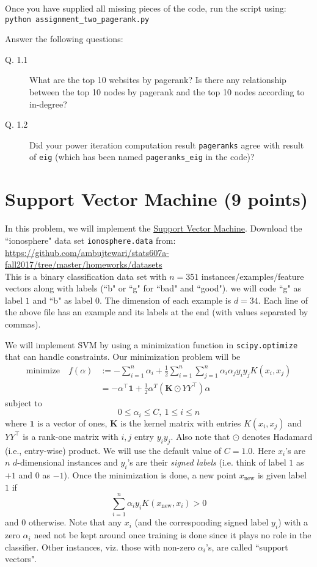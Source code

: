 \documentclass{article}
\begin{document}
Once you have supplied all missing pieces of the code, run the script using:\\
{\tt python assignment\_two\_pagerank.py}

Answer the following questions:
\begin{description}
\item[Q. 1.1]
What are the top 10 websites by pagerank? Is there any relationship between the top 10 nodes by pagerank and the top 10 nodes according to in-degree?
\item[Q. 1.2]
Did your power iteration computation result {\tt pageranks} agree with result of {\tt eig} (which has been named {\tt pageranks\_eig} in the code)?
\end{description}


\section{Support Vector Machine (9 points)}


In this problem, we will implement the \href{http://en.wikipedia.org/wiki/Support\_vector\_machine}{Support Vector Machine}.
Download the ``ionosphere" data set {\tt ionosphere.data} from:\\
\url{https://github.com/ambujtewari/stats607a-fall2017/tree/master/homeworks/datasets} \\
This is a binary classification data set with $n=351$ instances/examples/feature vectors along with labels (``b" or ``g" for ``bad" and ``good"). we will code ``g"
as label $1$ and ``b" as label $0$.
The dimension of each example is $d=34$. Each line of the above file has an example and its labels at the end (with values separated by commas).

We will implement SVM by using a minimization function in {\tt scipy.optimize} that can handle constraints. Our minimization problem will be
\begin{align*}
\text{minimize}\quad f(\alpha) &:= -\sum_{i=1}^n \alpha_i + \frac{1}{2} \sum_{i=1}^n \sum_{j=1}^n \alpha_i \alpha_j y_i y_j K(x_i, x_j) \\
&= -\alpha^\top \mathbf{1} + \frac{1}{2} \alpha^T (\mathbf{K} \odot YY^\top) \alpha
\end{align*}
subject to
$$
0 \leq \alpha_i \leq C,\ 1 \leq i \leq n
$$
where $\mathbf{1}$ is a vector of ones, $\mathbf{K}$ is the kernel matrix with entries $K(x_i, x_j)$ and $YY^\top$ is a rank-one matrix with $i, j$ entry $y_i y_j$. 
Also note that $\odot$ denotes Hadamard (i.e., entry-wise) product.
We will use the default value of $C=1.0$. Here $x_i$'s are $n$ $d$-dimensional instances and $y_i$'s are their \emph{signed labels} (i.e.
think of label $1$ as $+1$ and $0$ as $-1$). Once the minimization is done, a new point $x_{\text{new}}$ is given label $1$ if
\begin{equation}\label{eq:rule}
\sum_{i=1}^n \alpha_i y_i K(x_{\text{new}}, x_i) > 0
\end{equation}
and $0$ otherwise. Note that any $x_i$ (and the corresponding signed label $y_i$) with a zero $\alpha_i$ need not be kept around once training is done since it plays no role in the classifier.
Other instances, viz. those with non-zero $\alpha_i$'s, are called ``support vectors".
\end{document}
